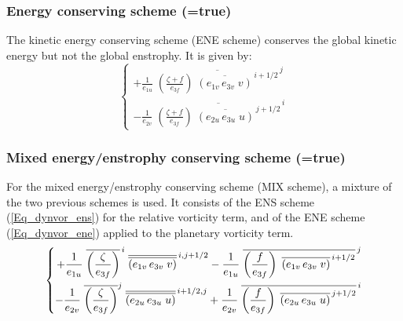 \subsubsection{Energy conserving scheme (=true)}
\label{DYN_vor_ene}

The kinetic energy conserving scheme (ENE scheme) conserves the global 
kinetic energy but not the global enstrophy. It is given by:
\begin{equation} \label{Eq_dynvor_ene}
\left\{   \begin{aligned}
{+\frac{1}{e_{1u}}\; {\overline {\left( {\frac{\zeta +f}{e_{3f} }} \right)
                            \;  \overline {\left( {e_{1v}\,e_{3v}\;v} \right)} ^{\,i+1/2}} }^{\,j} }    \\
{- \frac{1}{e_{2v}}\; {\overline {\left( {\frac{\zeta +f}{e_{3f} }} \right)
                            \;  \overline {\left( {e_{2u}\,e_{3u}\;u} \right)} ^{\,j+1/2}} }^{\,i} }
\end{aligned}    \right.
\end{equation} 

\subsubsection{Mixed energy/enstrophy conserving scheme (=true) }
\label{DYN_vor_mix}

For the mixed energy/enstrophy conserving scheme (MIX scheme), a mixture of the 
two previous schemes is used. It consists of the ENS scheme (\ref{Eq_dynvor_ens}) 
for the relative vorticity term, and of the ENE scheme (\ref{Eq_dynvor_ene}) applied 
to the planetary vorticity term.
\begin{equation} \label{Eq_dynvor_mix}
\left\{ {     \begin{aligned}
 {+\frac{1}{e_{1u} }\; {\overline {\left( {\frac{\zeta }{e_{3f} }} \right)} }^{\,i} 
 \; {\overline{\overline {\left( {e_{1v}\,e_{3v}\;v} \right)}} }^{\,i,j+1/2} -\frac{1}{e_{1u} }
 \; {\overline {\left( {\frac{f}{e_{3f} }} \right) 
 \;\overline {\left( {e_{1v}\,e_{3v}\;v} \right)} ^{\,i+1/2}} }^{\,j} } \\
{-\frac{1}{e_{2v} }\; {\overline {\left( {\frac{\zeta }{e_{3f} }} \right)} }^j
 \; {\overline{\overline {\left( {e_{2u}\,e_{3u}\;u} \right)}} }^{\,i+1/2,j} +\frac{1}{e_{2v} }
 \; {\overline {\left( {\frac{f}{e_{3f} }} \right)
 \;\overline {\left( {e_{2u}\,e_{3u}\;u} \right)} ^{\,j+1/2}} }^{\,i} } \hfill
\end{aligned}     } \right.
\end{equation} 

